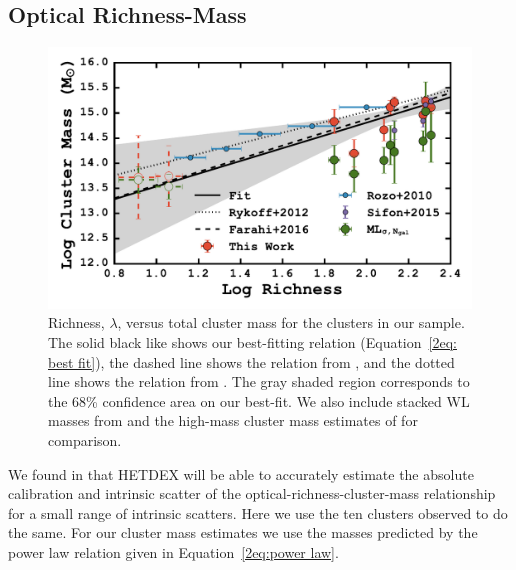 \subsection{Optical Richness-Mass}
\begin{figure}
	\begin{center}
		\includegraphics[width=\textwidth]{./figures2/massRichness.pdf} 
	\end{center}
	\caption[Richness versus total cluster mass for the clusters in our sample]{Richness, $\lambda$, versus total cluster mass for the clusters in our sample. The solid black like shows our best-fitting relation (Equation~\protect\ref{2eq: best fit}), the dashed line shows the relation from \protect\cite{Farahi2016}, and the dotted line shows the relation from \protect\cite{Rykoff2012}. The gray shaded region corresponds to the 68\% confidence area on our best-fit. We also include stacked WL masses from \protect\cite{Rozo2010} and the high-mass cluster mass estimates of \protect\cite{Sifon2015} for comparison.}
\label{2fig:massRichness} 
\end{figure}

We found in  that HETDEX will be able to accurately estimate the absolute calibration and intrinsic scatter of the optical-richness-cluster-mass relationship for a small range of intrinsic scatters. Here we use the ten clusters observed to do the same. For our cluster mass estimates we use the masses predicted by the power law relation given in Equation~\ref{2eq:power law}. 

